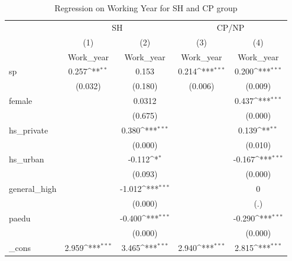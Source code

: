 \documentclass[]{AEA}
\def\sym#1{\ifmmode^{#1}\else\(^{#1}\)\fi}
\begin{document}
    \begin{center}
    \begin{table}
    \caption{Regression on Working Year for SH and CP group}
    \setlength{\tabcolsep}{0.5mm}
    \begin{tabular}{l*{4}c}
    \toprule
    &\multicolumn{2}{c}{SH} &\multicolumn{2}{c}{CP/NP} \\
    \cmidrule(l){2-3}\cmidrule(l){4-5}
    &\multicolumn{1}{c}{(1)}&\multicolumn{1}{c}{(2)}&\multicolumn{1}{c}{(3)}&\multicolumn{1}{c}{(4)}\\
    &\multicolumn{1}{c}{Work\_year}&\multicolumn{1}{c}{Work\_year}&\multicolumn{1}{c}{Work\_year}&\multicolumn{1}{c}{Work\_year}\\
    \midrule
    sp          &       0.257\sym{**} &       0.153         &       0.214\sym{***}&       0.200\sym{***}\\
                &     (0.032)         &     (0.180)         &     (0.006)         &     (0.009)         \\
    [1em]
    female      &                     &      0.0312         &                     &       0.437\sym{***}\\
                &                     &     (0.675)         &                     &     (0.000)         \\
    [1em]
    hs\_private  &                     &       0.380\sym{***}&                     &       0.139\sym{**} \\
                &                     &     (0.000)         &                     &     (0.010)         \\
    [1em]
    hs\_urban    &                     &      -0.112\sym{*}  &                     &      -0.167\sym{***}\\
                &                     &     (0.093)         &                     &     (0.000)         \\
    [1em]
    general\_high&                     &      -1.012\sym{***}&                     &           0         \\
                &                     &     (0.000)         &                     &         (.)         \\
    [1em]
    paedu       &                     &      -0.400\sym{***}&                     &      -0.290\sym{***}\\
                &                     &     (0.000)         &                     &     (0.000)         \\
    [1em]
    \_cons      &       2.959\sym{***}&       3.465\sym{***}&       2.940\sym{***}&       2.815\sym{***}\\

\end{tabular}
\end{table}
\end{center}
\end{document}
